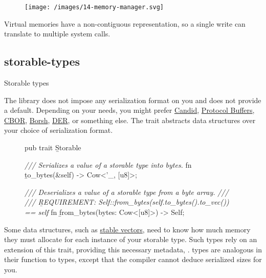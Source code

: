 \documentclass{article}
\begin{document}
\begin{figure}[grayscale-diagram]
\label{memory-manager}
\texttt{[image: /images/14-memory-manager.svg]}
\end{figure}

Virtual memories have a non-contiguous representation, so a single write can translate to multiple system calls.

\subsection{storable-types}{Storable types}

The library does not impose any serialization format on you and does not provide a default.
Depending on your needs, you might prefer \href{https://github.com/dfinity/candid}{Candid}, \href{https://developers.google.com/protocol-buffers}{Protocol Buffers}, \href{https://cbor.io/}{CBOR}, \href{https://borsh.io/}{Borsh}, \href{https://en.wikipedia.org/wiki/X.690#DER_encoding}{DER}, or something else.
The  trait abstracts data structures over your choice of serialization format.

\begin{figure}
\begin{code}[rust]
pub trait \b{Storable} {\label{storable-trait}
    \emph{/// Serializes a value of a storable type into bytes.}
    fn \b{to_bytes}(&self) -> Cow<'_, [u8]>;

    \emph{/// Deserializes a value of a storable type from a byte array.}
    \emph{///}
    \emph{/// \b{REQUIREMENT}: Self::from_bytes(self.to_bytes().to_vec()) == self}
    fn \b{from_bytes}(bytes: Cow<[u8]>) -> Self;
}
\end{code}
\end{figure}

Some data structures, such as \href{stable-vector}{stable vectors}, need to know how much memory they must allocate for each instance of your storable type.
Such types rely on an extension of this trait, providing this necessary metadata, .
 types are analogous in their function to \href{https://doc.rust-lang.org/std/marker/trait.Sized.html}{} types, except that the compiler cannot deduce serialized sizes for you.
\end{document}
